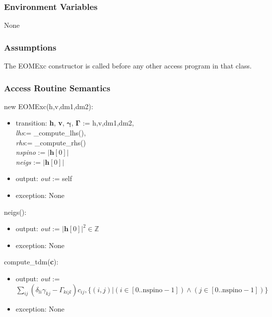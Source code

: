 \documentclass[12pt, titlepage]{article}
\begin{document}
\subsubsection{Environment Variables}

None

\subsubsection{Assumptions}

The EOMExc constructor is called before any other access program in that class.

\subsubsection{Access Routine Semantics}

\noindent new EOMExc(h,v,dm1,dm2):
\begin{itemize}
	\item transition: \textbf{h}, \textbf{v}, $\boldsymbol{\gamma}$, 
	$\boldsymbol{\Gamma}$ := h,v,dm1,dm2,\\ \textit{lhs}:= \_compute\_lhs(),\\ 
	\textit{rhs}:= \_compute\_rhs()\\
	\textit{nspino} := $|\boldsymbol{h}[0]|$\\
	\textit{neigs} := $|\boldsymbol{h}[0]|$
	\item output: \textit{out} := self 
	\item exception: None
\end{itemize}

neigs():
\begin{itemize}
	\item output: \textit{out} := $|\boldsymbol{h}[0]|^2 \in \mathbb{Z}$
	\item exception: None
\end{itemize}

\noindent compute\_tdm(\textbf{c}):
\begin{itemize}
	\item output: \textit{out} := $\sum_{ij}(\delta_{li}\gamma_{kj} - 
	\Gamma_{kijl}) c_{ij}, \{(i,j)|(i\in [0..\text{nspino}-1]) \land (j\in 
	[0..\text{nspino}-1])\}$
	\item exception: None
\end{itemize}
\end{document}
